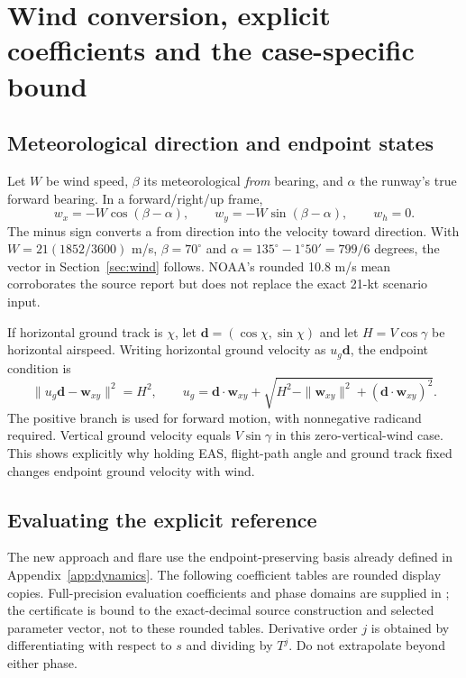 \section{Wind conversion, explicit coefficients and the case-specific bound}
\label{app:wind}
\subsection{Meteorological direction and endpoint states}
Let $W$ be wind speed, $\beta$ its meteorological \emph{from} bearing, and $\alpha$ the runway's true forward bearing. In a forward/right/up frame,
\begin{equation}
w_x=-W\cos(\beta-\alpha),\qquad
w_y=-W\sin(\beta-\alpha),\qquad w_h=0.
\end{equation}
The minus sign converts a from direction into the velocity toward direction. With $W=21(1852/3600)$ m/s, $\beta=70^\circ$ and $\alpha=135^\circ-1^\circ50'=799/6$ degrees, the vector in Section~\ref{sec:wind} follows. NOAA's rounded 10.8 m/s mean corroborates the source report but does not replace the exact 21-kt scenario input.

If horizontal ground track is $\chi$, let $\mathbf d=(\cos\chi,\sin\chi)$ and let $H=V\cos\gamma$ be horizontal airspeed. Writing horizontal ground velocity as $u_g\mathbf d$, the endpoint condition is
\begin{equation}
\|u_g\mathbf d-\mathbf w_{xy}\|^2=H^2,
\qquad
u_g=\mathbf d\!\cdot\!\mathbf w_{xy}
+\sqrt{H^2-\|\mathbf w_{xy}\|^2+(\mathbf d\!\cdot\!\mathbf w_{xy})^2}.
\end{equation}
The positive branch is used for forward motion, with nonnegative radicand required. Vertical ground velocity equals $V\sin\gamma$ in this zero-vertical-wind case. This shows explicitly why holding EAS, flight-path angle and ground track fixed changes endpoint ground velocity with wind.

\subsection{Evaluating the explicit reference}
The new approach and flare use the endpoint-preserving basis already defined in Appendix~\ref{app:dynamics}. The following coefficient tables are rounded display copies. Full-precision evaluation coefficients and phase domains are supplied in ; the certificate is bound to the exact-decimal source construction and selected parameter vector, not to these rounded tables. Derivative order $j$ is obtained by differentiating with respect to $s$ and dividing by $T^j$. Do not extrapolate beyond either phase.

